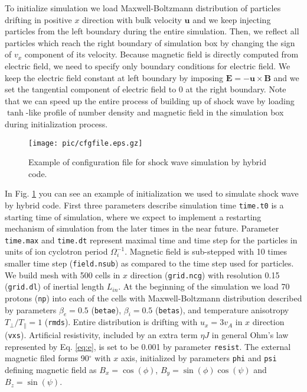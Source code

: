 \documentclass[oneside,branding,toc,article]{sat}
\newcommand{\mbf}[1]{\mathbf{#1}}              %
\begin{document}
To initialize simulation we load Maxwell-Boltzmann distribution of particles
drifting in positive $x$ direction with bulk velocity $\mbf{u}$ and we keep
injecting particles from the left boundary during the entire simulation.  Then,
we reflect all particles which reach the right boundary of simulation box by
changing the sign of $v_x$ component of its velocity. Because magnetic field is
directly computed from electric field, we need to specify only boundary
conditions for electric field. We keep the electric field constant at left
boundary by imposing $\mathbf{E} = - \mathbf{u} \times \mathbf{B}$ and we set
the tangential component of electric field to 0 at the right boundary.  Note
that we can speed up the entire process of building up of shock wave by loading
$\tanh$-like profile of number density and magnetic field in the
simulation box during initialization process.

\begin{figure}[!h]
  \centering
  \texttt{[image: pic/cfgfile.eps.gz]}
  \caption{Example of configuration file for shock wave simulation by hybrid
    code.}
  \label{fig:cfg}
\end{figure}

In Fig. \ref{fig:cfg} you can see an example of initialization we used to
simulate shock wave by hybrid code.  First three parameters describe simulation
time \texttt{time.t0} is a starting time of simulation, where we expect to
implement a restarting mechanism of simulation from the later times in the near
future.  Parameter \texttt{time.max} and \texttt{time.dt} represent maximal
time and time step for the particles in units of ion cyclotron period
$\Omega_i^{-1}$.  Magnetic field is sub-stepped with 10 times smaller time step
(\texttt{field.nsub}) as compared to the time step used for particles.  We
build mesh with 500 cells in $x$ direction (\texttt{grid.ncg}) with resolution
0.15 (\texttt{grid.dl}) of inertial length $L_{in}$.  At the beginning of the
simulation we load 70 protons (\texttt{np}) into each of the cells with
Maxwell-Boltzmann distribution described by parameters $\beta_e = 0.5$
(\texttt{betae}), $\beta_i = 0.5$ (\texttt{betas}), and temperature anisotropy
$T_\perp / T_\parallel = 1$ (\texttt{rmds}).  Entire distribution is drifting
with $u_x = 3 v_A$ in $x$ direction (\texttt{vxs}).  Artificial resistivity,
included by an extra term $\eta J$ in general Ohm's law represented by
Eq. \ref{eq:e}, is set to be 0.001 by parameter \texttt{resist}.  The external
magnetic filed forms 90$^\circ$ with $x$ axis, initialized by parameters
\texttt{phi} and \texttt{psi} defining magnetic field as $B_x = \cos (\phi)$,
$B_y = \sin (\phi) \cos (\psi)$ and $B_z = \sin (\psi)$.
\end{document}
